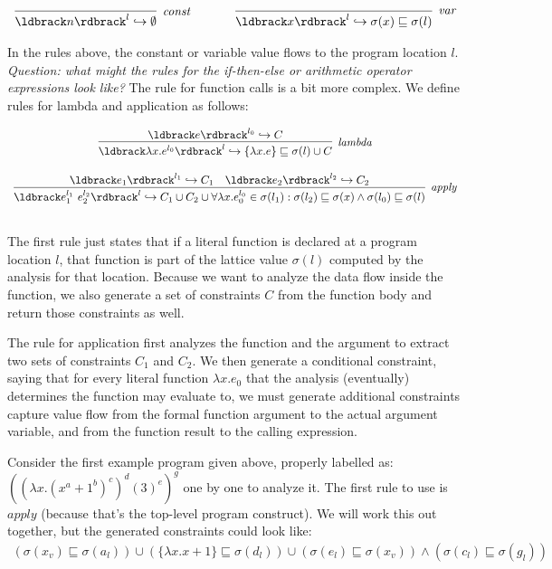 \documentclass[11pt]{article}
\newcommand{\parg}[1] %
  {\ldbrack #1 \rdbrack}
\newcommand{\alap}{\sqsubseteq}
\begin{document}
\[
\begin{array}{ccc}
\infer[\textit{const}]
	{\parg{n}^l \hookrightarrow \emptyset}
    	{} 
	& ~~~~~ &
\infer[\textit{var}]
	{\parg{x}^l \hookrightarrow \sigma(x) \sqsubseteq \sigma(l)}
	{}\\
\end{array}
\]

In the rules above, the constant or variable value flows to the program location $l$. \emph{Question: what might the rules for the if-then-else or arithmetic operator expressions look like?}    The rule for function calls is a bit more complex.  We define rules for lambda and application as follows:

\[
\begin{array}{c}
\infer[\textit{lambda}]
	{\parg{\lambda x . e^{l_0}}^l \hookrightarrow \{\lambda x . e\} \alap \sigma(l) \cup C}
	{\parg{e}^{l_0} \hookrightarrow C}\\[3ex]
	
\infer[\textit{apply}]
	{\parg{e_1^{l_1} ~ e_2^{l_2}}^l \hookrightarrow C_1 \cup C_2 \cup \forall \lambda x . e_0^{l_0} \in \sigma(l_1): \sigma(l_2) \alap \sigma(x) \land \sigma(l_0) \alap \sigma(l)}
	{\parg{e_1}^{l_1} \hookrightarrow C_1 & \parg{e_2}^{l_2} \hookrightarrow C_2}\\[3ex]
	
\end{array}
\]


The first rule just states that if a literal function is declared at a program location $l$, that function is part of the lattice value $\sigma(l)$ computed by the analysis for that location.  Because we want to analyze the data flow inside the function, we also generate a set of constraints $C$ from the function body and return those constraints as well.

The rule for application first analyzes the function and the argument to extract two sets of constraints $C_1$ and $C_2$.  We then generate a conditional constraint, saying that for every literal function $\lambda x . e_0$ that the analysis (eventually) determines the function may evaluate to, we must generate additional constraints capture value flow from the formal function argument to the actual argument variable, and from the function result to the calling expression.

Consider the first example program given above, properly labelled as: $((\lambda x . (x^a + 1^b)^c)^d (3)^e)^g$ one by one to analyze it.  The first rule to use is $apply$ (because that's the top-level program construct).  We will work this out together, but the generated constraints could look like:
\[
\begin{array}{cc}
(\sigma(x_v) \sqsubseteq \sigma(a_l)) \cup (\{ \lambda x.x + 1\} \alap \sigma(d_l)) 
\cup (\sigma(e_l) \alap \sigma (x_v)) \wedge (\sigma (c _l) \alap \sigma (g_l))
\end{array}
\]
\end{document}
